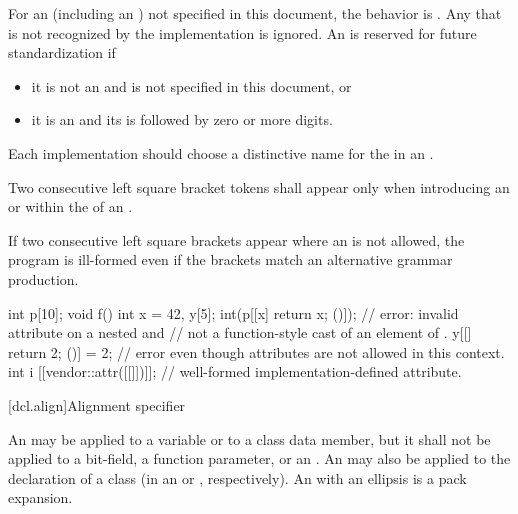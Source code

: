 \pnum
For an 
(including an )
not specified in this document, the
behavior is .
Any  that is not recognized by the implementation
is ignored.
An  is reserved for future standardization if
\begin{itemize}
\item it is not an  and
is not specified in this document, or
\item it is an  and
its  is
 followed by zero or more digits.
\end{itemize}
Each implementation should choose a distinctive name for the
 in an .

\pnum
Two consecutive left square bracket tokens shall appear only
when introducing an  or
within the  of
an .
\begin{note}
If two consecutive left square brackets appear
where an  is not allowed, the program is ill-formed even
if the brackets match an alternative grammar production.
\end{note}
\begin{example}
\begin{codeblock}
int p[10];
void f() {
  int x = 42, y[5];
  int(p[[x] { return x; }()]);  // error: invalid attribute on a nested  and
                                // not a function-style cast of an element of .
  y[[] { return 2; }()] = 2;    // error even though attributes are not allowed in this context.
  int i [[vendor::attr([[]])]]; // well-formed implementation-defined attribute.
}
\end{codeblock}
\end{example}

[dcl.align]{Alignment specifier}%

\pnum
An 
may be applied to a variable
or to a class data member, but it shall not be applied to a bit-field, a function
parameter, or an .
An  may also be applied to the declaration
of a class (in an
 or
, respectively).
An  with an ellipsis is a pack expansion.

